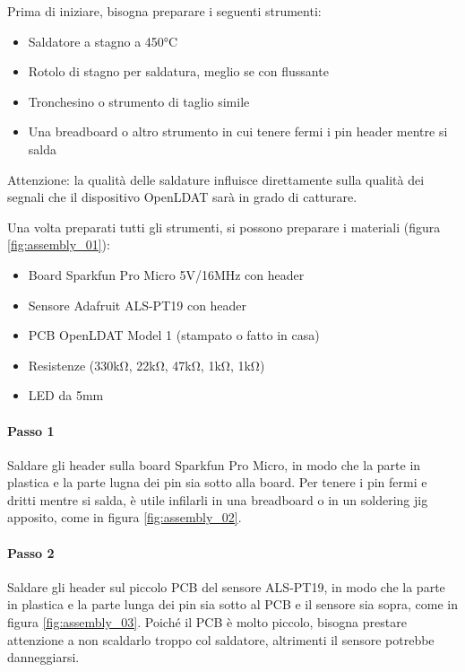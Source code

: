 Prima di iniziare, bisogna preparare i seguenti strumenti:
\begin{itemize}
	\item Saldatore a stagno a 450°C
	\item Rotolo di stagno per saldatura, meglio se con flussante
	\item Tronchesino o strumento di taglio simile
	\item Una breadboard o altro strumento in cui tenere fermi i pin header mentre si salda
\end{itemize}

Attenzione: la qualità delle saldature influisce direttamente sulla qualità dei segnali che il dispositivo OpenLDAT sarà in grado di catturare.

Una volta preparati tutti gli strumenti, si possono preparare i materiali (figura \ref{fig:assembly_01}):
\begin{itemize}
	\item Board Sparkfun Pro Micro 5V/16MHz con header
	\item Sensore Adafruit ALS-PT19 con header
	\item PCB OpenLDAT Model 1 (stampato o fatto in casa)
	\item Resistenze (330k\si{\ohm}, 22k\si{\ohm}, 47k\si{\ohm}, 1k\si{\ohm}, 1k\si{\ohm})
	\item LED da 5mm
\end{itemize}

\paragraph{Passo 1} Saldare gli header sulla board Sparkfun Pro Micro, in modo che la parte in plastica e la parte lugna dei pin sia sotto alla board. Per tenere i pin fermi e dritti mentre si salda, è utile infilarli in una breadboard o in un soldering jig apposito, come in figura \ref{fig:assembly_02}.

\paragraph{Passo 2} Saldare gli header sul piccolo PCB del sensore ALS-PT19, in modo che la parte in plastica e la parte lunga dei pin sia sotto al PCB e il sensore sia sopra, come in figura \ref{fig:assembly_03}. Poiché il PCB è molto piccolo, bisogna prestare attenzione a non scaldarlo troppo col saldatore, altrimenti il sensore potrebbe danneggiarsi.

